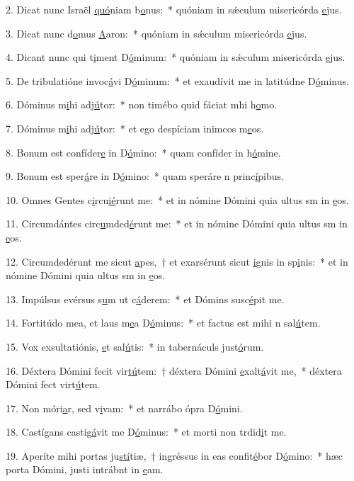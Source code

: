 2. Dicat nunc Israël \uline{quó}niam b\uline{o}nus:~* quóniam in sǽculum misericórda \uline{e}jus.\par 
3. Dicat nunc d\uline{o}mus \uline{A}aron:~* quóniam in sǽculum misericórda \uline{e}jus.\par 
4. Dicant nunc qui t\uline{i}ment D\uline{ó}minum:~* quóniam in sǽculum misericórda \uline{e}jus.\par 
5. De tribulatióne invoc\uline{á}vi D\uline{ó}minum:~* et exaudívit me in latitúdne D\uline{ó}minus.\par 
6. Dóminus m\uline{i}hi adj\uline{ú}tor:~* non timébo quid fáciat mhi h\uline{o}mo.\par 
7. Dóminus m\uline{i}hi adj\uline{ú}tor:~* et ego despíciam inimcos m\uline{e}os.\par 
8. Bonum est confíder\uline{e} in D\uline{ó}mino:~* quam confíder in h\uline{ó}mine.\par 
9. Bonum est sper\uline{á}re in D\uline{ó}mino:~* quam speráre n princ\uline{í}pibus.\par 
10. Omnes Gentes c\uline{i}rcu\uline{ié}runt me:~* et in nómine Dómini quia ultus sm in \uline{e}os.\par 
11. Circumdántes circ\uline{u}mded\uline{é}runt me:~* et in nómine Dómini quia ultus sm in \uline{e}os.\par 
12. Circumdedérunt me sicut \uline{a}pes,~† et exarsérunt sicut \uline{i}gnis in sp\uline{i}nis:~* et in nómine Dómini quia ultus sm in \uline{e}os.\par 
13. Impúlsus evérsus s\uline{u}m ut c\uline{á}derem:~* et Dómins susc\uline{é}pit me.\par 
14. Fortitúdo mea, et laus m\uline{e}a D\uline{ó}minus:~* et factus est mihi n sal\uline{ú}tem.\par 
15. Vox exsultatiónis, \uline{e}t sal\uline{ú}tis:~* in tabernáculs just\uline{ó}rum.\par 
16. Déxtera Dómini fecit vir\uline{tú}tem:~† déxtera Dómini \uline{e}xalt\uline{á}vit me,~* déxtera Dómini fect virt\uline{ú}tem.\par 
17. Non móri\uline{a}r, sed v\uline{i}vam:~* et narrábo ópra D\uline{ó}mini.\par 
18. Castígans castig\uline{á}vit me D\uline{ó}minus:~* et morti non trdid\uline{i}t me.\par 
19. Aperíte mihi portas ju\uline{stí}tiæ,~† ingréssus in eas confit\uline{é}bor D\uline{ó}mino:~* hæc porta Dómini, justi intrábnt in \uline{e}am.\par 
